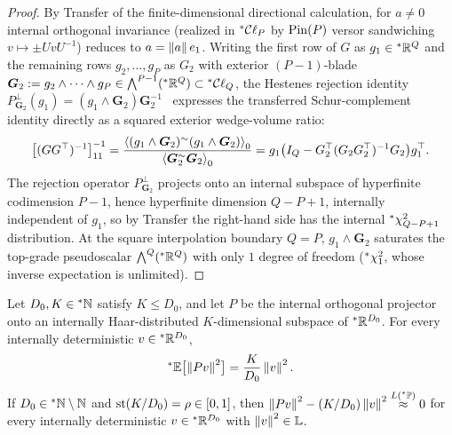 \begin{proof}
By Transfer of the finite-dimensional directional calculation, for $a \neq 0$ internal orthogonal invariance (realized in ${}^*\mathcal{C}\ell_P$ by $\operatorname{Pin}(P)$ versor sandwiching $v \mapsto \pm U v U^{-1}$) reduces to $a = \left\lVert a \right\rVert e_1$. Writing the first row of $G$ as $g_1 \in {}^*\mathbb{R}^Q$ and the remaining rows $g_2, \dots, g_P$ as $G_2$ with exterior $(P-1)$-blade $\bm{G}_2 := g_2 \wedge \dots \wedge g_P \in \bigwedge^{P-1}({}^*\mathbb{R}^Q) \subset {}^*\mathcal{C}\ell_Q$, the Hestenes rejection identity $P_{\bm{G}_2}^\perp(g_1) = (g_1 \wedge \bm{G}_2)\bm{G}_2^{-1}$~\cite{hestenes1984clifford} expresses the transferred Schur-complement identity directly as a squared exterior wedge-volume ratio:
\begin{equation}\label{eq:3.18}
\bigl[(G G^\top)^{-1}\bigr]_{11}^{-1} = \frac{\left\langle (g_1 \wedge \bm{G}_2)^{\sim}(g_1 \wedge \bm{G}_2) \right\rangle_0}{\left\langle \bm{G}_2^{\sim}\bm{G}_2 \right\rangle_0} = g_1\bigl(I_Q - G_2^\top(G_2 G_2^\top)^{-1}G_2\bigr)g_1^\top.
\end{equation}
The rejection operator $P_{\bm{G}_2}^\perp$ projects onto an internal subspace of hyperfinite codimension $P - 1$, hence hyperfinite dimension $Q - P + 1$, internally independent of $g_1$, so by Transfer the right-hand side has the internal ${}^*\chi^2_{Q - P + 1}$ distribution. At the square interpolation boundary $Q = P$, $g_1 \wedge \bm{G}_2$ saturates the top-grade pseudoscalar $\bigwedge^Q({}^*\mathbb{R}^Q)$ with only $1$ degree of freedom (${}^*\chi_1^2$, whose inverse expectation is unlimited).
\end{proof}

\begin{lemma}\label{lem:3.4}
Let $D_0, K \in {}^*\mathbb{N}$ satisfy $K \le D_0$, and let $P$ be the internal orthogonal projector onto an internally Haar-distributed $K$-dimensional subspace of ${}^*\mathbb{R}^{D_0}$. For every internally deterministic $v \in {}^*\mathbb{R}^{D_0}$,
\begin{equation}\label{eq:3.19}
{}^*\mathbb{E}\bigl[\left\lVert Pv \right\rVert^2\bigr] = \frac{K}{D_0}\left\lVert v \right\rVert^2.
\end{equation}
If $D_0 \in {}^*\mathbb{N} \setminus \mathbb{N}$ and $\operatorname{st}(K / D_0) = \rho \in [0, 1]$, then $\left\lVert Pv \right\rVert^2 - (K / D_0)\left\lVert v \right\rVert^2 \stackrel{L({}^*\mathbb{P})}{\approx} 0$ for every internally deterministic $v \in {}^*\mathbb{R}^{D_0}$ with $\left\lVert v \right\rVert^2 \in \mathbb{L}$.
\end{lemma}

